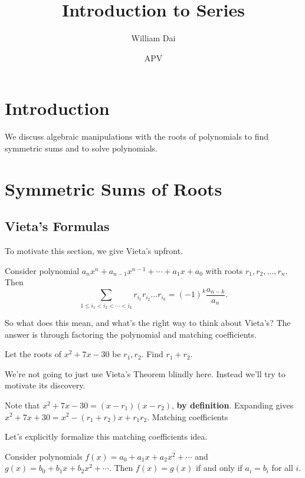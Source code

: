 \documentclass[mast]{lucky}
\title{Introduction to Series}
\author{William Dai}
\date{APV}
\begin{document}
\maketitle

\section{Introduction}

We discuss algebraic manipulations with the roots of polynomials to find symmetric sums and to solve polynomials.

\newpage
\section{Symmetric Sums of Roots}
\subsection{Vieta's Formulas}
To motivate this section, we give Vieta's upfront.

\begin{theo}
Consider polynomial $a_nx^n+a_{n-1}x^{n-1}+\cdots+a_{1}x+a_0$ with roots $r_1,r_2,\ldots,r_n.$ Then
\[\sum\limits_{1\leq i_1<i_2<\cdots<i_k}r_{i_1}r_{i_2}\ldots r_{i_k}=(-1)^k\frac{a_{n-k}}{a_n}.\]
\end{theo}

So what does this mean, and what's the right way to think about Vieta's? The answer is through factoring the polynomial and matching coefficients.

\begin{exam}[Quadratic]
Let the roots of $x^2+7x-30$ be $r_1,r_2.$ Find $r_1+r_2.$
\end{exam}

We're not going to just use Vieta's Theorem blindly here. Instead we'll try to motivate its discovery.

\begin{sol}
Note that $x^2+7x-30=(x-r_1)(x-r_2)$, \textbf{by definition}. Expanding gives $x^2+7x+30=x^2-(r_1+r_2)x+r_1r_2.$ Matching coefficients
\end{sol}

Let's explicitly formalize this matching coefficients idea.

\begin{theo}
Consider polynomials $f(x)=a_0+a_1x+a_2x^2+\cdots$ and $g(x)=b_0+b_1x+b_2x^2+\cdots.$ Then $f(x)=g(x)$ if and only if $a_i=b_i$ for all $i.$\footnotemark
\end{theo}
\end{document}
